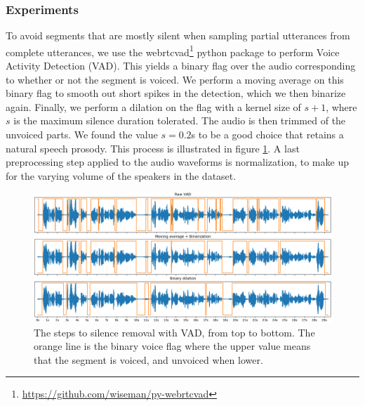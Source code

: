 \documentclass[a4paper, oneside, 12pt, english]{article}
\begin{document}
\subsubsection{Experiments}
To avoid segments that are mostly silent when sampling partial utterances from complete utterances, we use the webrtcvad\footnote{\url{https://github.com/wiseman/py-webrtcvad}} python package to perform Voice Activity Detection (VAD). This yields a binary flag over the audio corresponding to whether or not the segment is voiced. We perform a moving average on this binary flag to smooth out short spikes in the detection, which we then binarize again. Finally, we perform a dilation on the flag with a kernel size of $s + 1$, where $s$ is the maximum silence duration tolerated. The audio is then trimmed of the unvoiced parts. We found the value $s=0.2$s to be a good choice that retains a natural speech prosody. This process is illustrated in figure \ref{encoder_preprocess_vad}. A last preprocessing step applied to the audio waveforms is normalization, to make up for the varying volume of the speakers in the dataset.

\begin{figure}[h]
	\centering
	\includegraphics[width=0.95\linewidth]{images/encoder_preprocess_vad.png}
	\caption{The steps to silence removal with VAD, from top to bottom. The orange line is the binary voice flag where the upper value means that the segment is voiced, and unvoiced when lower.}
	\label{encoder_preprocess_vad}
\end{figure}
\end{document}
